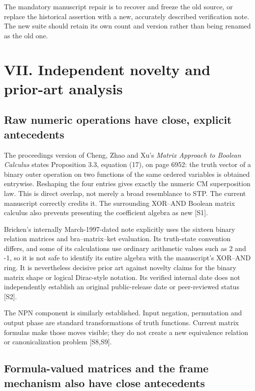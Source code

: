 \documentclass[
  10pt,
]{article}
\begin{document}
The mandatory manuscript repair is to recover and freeze the old source,
or replace the historical assertion with a new, accurately described
verification note. The new suite should retain its own count and version
rather than being renamed as the old one.

\section{VII. Independent novelty and prior-art
analysis}\label{vii.-independent-novelty-and-prior-art-analysis}

\subsection{Raw numeric operations have close, explicit
antecedents}\label{raw-numeric-operations-have-close-explicit-antecedents}

The proceedings version of Cheng, Zhao and Xu's \emph{Matrix Approach to
Boolean Calculus} states Proposition 3.3, equation (17), on page 6952:
the truth vector of a binary outer operation on two functions of the
same ordered variables is obtained entrywise. Reshaping the four entries
gives exactly the numeric CM superposition law. This is direct overlap,
not merely a broad resemblance to STP. The current manuscript correctly
credits it. The surrounding XOR--AND Boolean matrix calculus also
prevents presenting the coefficient algebra as new {[}S1{]}.

Bricken's internally March-1997-dated note explicitly uses the sixteen
binary relation matrices and bra--matrix--ket evaluation. Its
truth-state convention differs, and some of its calculations use
ordinary arithmetic values such as 2 and -1, so it is not safe to
identify its entire algebra with the manuscript's XOR--AND ring. It is
nevertheless decisive prior art against novelty claims for the binary
matrix shape or logical Dirac-style notation. Its verified internal date
does not independently establish an original public-release date or
peer-reviewed status {[}S2{]}.

The NPN component is similarly established. Input negation, permutation
and output phase are standard transformations of truth functions.
Current matrix formulas make those moves visible; they do not create a
new equivalence relation or canonicalization problem {[}S8,S9{]}.

\subsection{Formula-valued matrices and the frame mechanism also have
close
antecedents}\label{formula-valued-matrices-and-the-frame-mechanism-also-have-close-antecedents}
\end{document}
